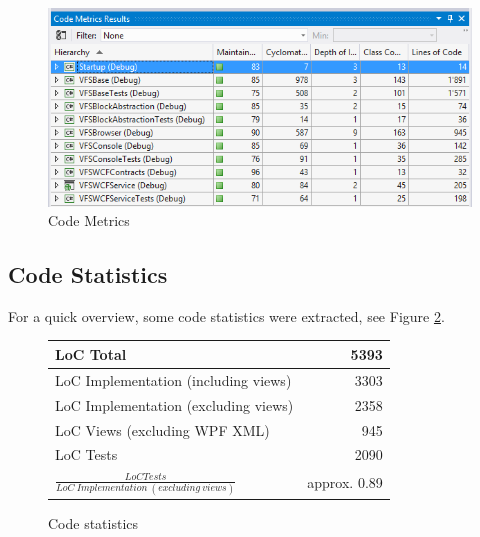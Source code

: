 \documentclass[JCDReport.tex]{subfiles}
\begin{document}
\begin{figure}[h!]
	\centering
	\includegraphics[scale=0.75]{Images/code_metrics.png} 
	\caption{Code Metrics}
	\label{fig:codeMetrics}
\end{figure}	

\subsection{Code Statistics}

For a quick overview, some code statistics were extracted, see Figure \ref{fig:codeStatistics}.

\begin{figure}[h!]
	\centering
	\begin{tabular}{|l|r|}
	\hline 
	LoC Total & 5393 \\ 
	\hline 
	LoC Implementation (including views) & 3303 \\ 
	\hline 
	LoC Implementation (excluding views) & 2358 \\ 
	\hline 
	LoC Views (excluding WPF XML) & 945 \\ 
	\hline 
	LoC Tests & 2090 \\ 
	\hline 
	{\Large $\frac{LoC Tests}{LoC\ Implementation\ (excluding\ views)}$} & approx. 0.89 \\
	\hline 
	\end{tabular}
	\label{fig:codeStatistics}
	\caption{Code statistics}
\end{figure}	
\end{document}
